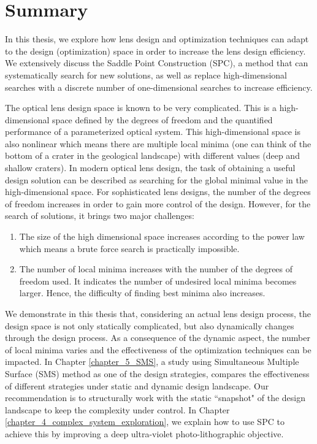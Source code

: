 \chapter*{Summary}

In this thesis, we explore how lens design and optimization techniques can adapt to the design (optimization) space in order to increase the lens design efficiency. We extensively discuss the Saddle Point Construction (SPC), a method that can systematically search for new solutions, as well as replace high-dimensional searches with a discrete number of one-dimensional searches to increase efficiency. 

The optical lens design space is known to be very complicated. This is a high-dimensional space defined by the degrees of freedom and the quantified performance of a parameterized optical system. This high-dimensional space is also nonlinear which means there are multiple local minima (one can think of the bottom of a crater in the geological landscape) with different values (deep and shallow craters). In modern optical lens design, the task of obtaining a useful design solution can be described as searching for the global minimal value in the high-dimensional space. 
For sophisticated lens designs, the number of the degrees of freedom increases in order to gain more control of the design. However, for the search of solutions, it brings two major challenges:  
\begin{enumerate}[nosep]
\item The size of the high dimensional space increases according to the power law which means a brute force search is practically impossible. 
\item The number of local minima increases with the number of the degrees of freedom used. It indicates the number of undesired local minima becomes larger. Hence, the difficulty of finding best minima also increases.  
\end{enumerate}

We demonstrate in this thesis that, considering an actual lens design process, the design space is not only statically complicated, but also dynamically changes through the design process. As a consequence of the dynamic aspect, the number of local minima varies and the effectiveness of the optimization techniques can be impacted. In Chapter \ref{chapter_5_SMS}, a study using Simultaneous Multiple Surface (SMS) method as one of the design strategies, compares the effectiveness of different strategies under static and dynamic design landscape. Our recommendation is to structurally work with the static “snapshot" of the design landscape to keep the complexity under control. In Chapter \ref{chapter_4_complex_system_exploration}, we explain how to use SPC to achieve this by improving a deep ultra-violet photo-lithographic objective.

